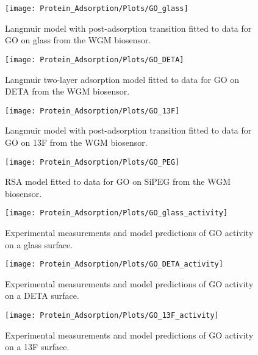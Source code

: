 %
\begin{figure}
\texttt{[image: Protein\_Adsorption/Plots/GO\_glass]}\caption{\label{fig:GO glass plot}Langmuir model with post-adsorption transition
fitted to data for GO on glass from the WGM biosensor.}
%
\end{figure}
%
\begin{figure}
\texttt{[image: Protein\_Adsorption/Plots/GO\_DETA]}

\caption{\label{fig:GO on DETA}Langmuir two-layer adsorption model fitted
to data for GO on DETA from the WGM biosensor.}
%
\end{figure}
%
\begin{figure}
\texttt{[image: Protein\_Adsorption/Plots/GO\_13F]}

\caption{\label{fig:GO on 13F}Langmuir model with post-adsorption transition
fitted to data for GO on 13F from the WGM biosensor.}
%
\end{figure}
%
\begin{figure}
\texttt{[image: Protein\_Adsorption/Plots/GO\_PEG]}

\caption{\label{fig:GO on PEG}RSA model fitted to data for GO on SiPEG from
the WGM biosensor.}
%
\end{figure}
%
\begin{figure}
\texttt{[image: Protein\_Adsorption/Plots/GO\_glass\_activity]}

\caption{\label{fig:GO glass activity}Experimental measurements and model
predictions of GO activity on a glass surface.}


%
\end{figure}
%
\begin{figure}
\texttt{[image: Protein\_Adsorption/Plots/GO\_DETA\_activity]}

\caption{\label{fig:GO DETA activity}Experimental measurements and model predictions
of GO activity on a DETA surface.}
%
\end{figure}
%
\begin{figure}
\texttt{[image: Protein\_Adsorption/Plots/GO\_13F\_activity]}

\caption{\label{fig:GO 13F activity}Experimental measurements and model predictions
of GO activity on a 13F surface.}
%
\end{figure}
%
